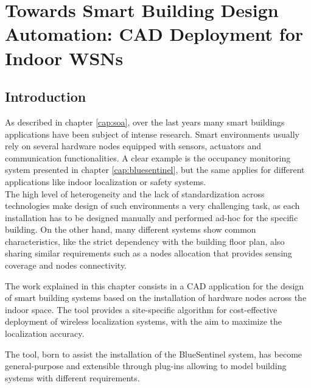%

\chapter[CAD Deployment for Indoor WSNs]{Towards Smart Building Design Automation: CAD Deployment for Indoor WSNs}
\label{cap:cad}


\section{Introduction}
\label{sec:CADintro}
As described in chapter \ref{cap:soa}, over the last years many smart buildings applications have been subject of intense research.
Smart environments usually rely on several hardware nodes equipped with sensors, actuators and communication functionalities.
A clear example is the occupancy monitoring system presented in chapter \ref{cap:bluesentinel}, but the same applies for different applications like indoor localization or safety systems.\\
The high level of heterogeneity and the lack of standardization across technologies make design of such environments a very challenging task, as each installation has to be designed manually and performed ad-hoc for the specific building.
On the other hand, many different systems show common characteristics, like the strict dependency with the building floor plan, also sharing similar requirements such as a nodes allocation that provides sensing coverage and nodes connectivity.

The work explained in this chapter consists in a CAD application for the design of smart building systems based on the installation of hardware nodes across the indoor space. The tool provides a site-specific algorithm for cost-effective deployment of wireless localization systems, with the aim to maximize the localization accuracy.

The tool, born to assist the installation of the BlueSentinel system, has become general-purpose and extensible through plug-ins allowing to model building systems with different requirements.

